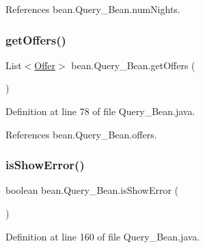 References bean.\+Query\+\_\+\+Bean.\+num\+Nights.

\mbox{\label{classbean_1_1Query__Bean_a959034af24769ce6348b49a1c0c57d6f}} 
\subsubsection{\texorpdfstring{getOffers()}{getOffers()}}
{\footnotesize\ttfamily List$<$\mbox{\hyperlink{classdomain_1_1Offer}{Offer}}$>$ bean.\+Query\+\_\+\+Bean.\+get\+Offers (\begin{DoxyParamCaption}{ }\end{DoxyParamCaption})}



Definition at line 78 of file Query\+\_\+\+Bean.\+java.


\begin{DoxyCode}{0}

\end{DoxyCode}


References bean.\+Query\+\_\+\+Bean.\+offers.

\mbox{\label{classbean_1_1Query__Bean_a906820e31a37424ec307634523ccfbdd}} 
\subsubsection{\texorpdfstring{isShowError()}{isShowError()}}
{\footnotesize\ttfamily boolean bean.\+Query\+\_\+\+Bean.\+is\+Show\+Error (\begin{DoxyParamCaption}{ }\end{DoxyParamCaption})}



Definition at line 160 of file Query\+\_\+\+Bean.\+java.


\begin{DoxyCode}{0}

\end{DoxyCode}


